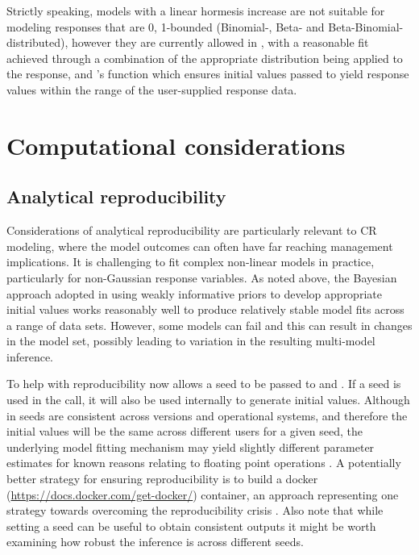 \documentclass[
  shortnames]{jss}
\begin{document}
Strictly speaking, models with a linear hormesis increase are not suitable for modeling responses that are 0, 1-bounded (Binomial-, Beta- and Beta-Binomial-distributed), however they are currently allowed in , with a reasonable fit achieved through a combination of the appropriate distribution being applied to the response, and 's  function which ensures initial values passed to  yield response values within the range of the user-supplied response data.

\section[Computational considerations]{Computational considerations}\label{comptime}

\hypertarget{analytical-reproducibility}{%
\subsection{Analytical reproducibility}\label{analytical-reproducibility}}

Considerations of analytical reproducibility are particularly relevant to CR modeling, where the model outcomes can often have far reaching management implications. It is challenging to fit complex non-linear models in practice, particularly for non-Gaussian response variables. As noted above, the Bayesian approach adopted in  using weakly informative priors to develop appropriate initial values works reasonably well to produce relatively stable model fits across a range of data sets. However, some models can fail and this can result in changes in the model set, possibly leading to variation in the resulting multi-model inference.

To help with reproducibility  now allows a seed to be passed to  and . If a seed is used in the  call, it will also be used internally to generate initial values. Although in  seeds are consistent across versions and operational systems, and therefore the initial values will be the same across different users for a given seed, the underlying  model fitting mechanism may yield slightly different parameter estimates for known reasons relating to floating point operations \citep[see chapter 20 in][]{stan2021}. A potentially better strategy for ensuring reproducibility is to build a docker (\url{https://docs.docker.com/get-docker/}) container, an approach representing one strategy towards overcoming the reproducibility crisis \citep{Baker2016}. Also note that while setting a seed can be useful to obtain consistent outputs it might be worth examining how robust the inference is across different seeds.
\end{document}
